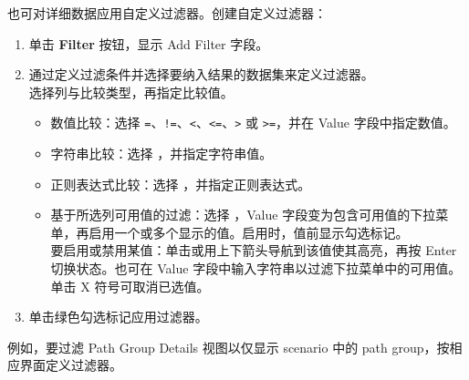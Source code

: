 也可对详细数据应用自定义过滤器。创建自定义过滤器：
\begin{enumerate}
  \item 单击 \textbf{Filter} 按钮，显示 Add Filter 字段。
  \item 通过定义过滤条件并选择要纳入结果的数据集来定义过滤器。\\
        选择列与比较类型，再指定比较值。
        \begin{itemize}
          \item 数值比较：选择 \texttt{=}、\texttt{!=}、\texttt{<}、\texttt{<=}、\texttt{>} 或 \texttt{>=}，并在 Value 字段中指定数值。
          \item 字符串比较：选择 ，并指定字符串值。
          \item 正则表达式比较：选择 ，并指定正则表达式。
          \item 基于所选列可用值的过滤：选择 ，Value 字段变为包含可用值的下拉菜单，再启用一个或多个显示的值。启用时，值前显示勾选标记。\\
                要启用或禁用某值：单击或用上下箭头导航到该值使其高亮，再按 Enter 切换状态。也可在 Value 字段中输入字符串以过滤下拉菜单中的可用值。单击 X 符号可取消已选值。
        \end{itemize}
  \item 单击绿色勾选标记应用过滤器。
\end{enumerate}

例如，要过滤 Path Group Details 视图以仅显示  scenario 中的 path group，按相应界面定义过滤器。
